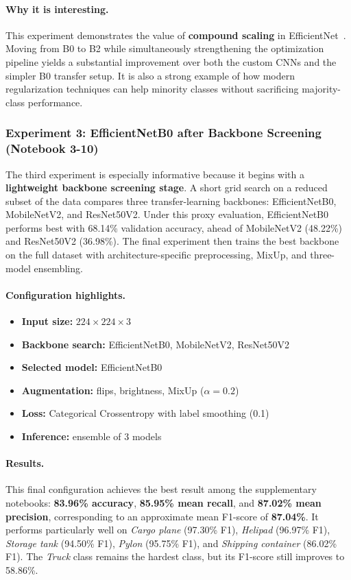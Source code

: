 \paragraph{Why it is interesting.} This experiment demonstrates the value of \textbf{compound scaling} in EfficientNet~\autocite{tan2019efficientnet}. Moving from B0 to B2 while simultaneously strengthening the optimization pipeline yields a substantial improvement over both the custom CNNs and the simpler B0 transfer setup. It is also a strong example of how modern regularization techniques can help minority classes without sacrificing majority-class performance.

\subsubsection{Experiment 3: EfficientNetB0 after Backbone Screening (Notebook 3-10)}

The third experiment is especially informative because it begins with a \textbf{lightweight backbone screening stage}. A short grid search on a reduced subset of the data compares three transfer-learning backbones: EfficientNetB0, MobileNetV2, and ResNet50V2. Under this proxy evaluation, EfficientNetB0 performs best with 68.14\% validation accuracy, ahead of MobileNetV2 (48.22\%) and ResNet50V2 (36.98\%). The final experiment then trains the best backbone on the full dataset with architecture-specific preprocessing, MixUp, and three-model ensembling.

\paragraph{Configuration highlights.}
\begin{itemize}
    \item \textbf{Input size:} $224 \times 224 \times 3$
    \item \textbf{Backbone search:} EfficientNetB0, MobileNetV2, ResNet50V2
    \item \textbf{Selected model:} EfficientNetB0
    \item \textbf{Augmentation:} flips, brightness, MixUp ($\alpha=0.2$)
    \item \textbf{Loss:} Categorical Crossentropy with label smoothing (0.1)
    \item \textbf{Inference:} ensemble of 3 models
\end{itemize}

\paragraph{Results.} This final configuration achieves the best result among the supplementary notebooks: \textbf{83.96\% accuracy}, \textbf{85.95\% mean recall}, and \textbf{87.02\% mean precision}, corresponding to an approximate mean F1-score of \textbf{87.04\%}. It performs particularly well on \textit{Cargo plane} (97.30\% F1), \textit{Helipad} (96.97\% F1), \textit{Storage tank} (94.50\% F1), \textit{Pylon} (95.75\% F1), and \textit{Shipping container} (86.02\% F1). The \textit{Truck} class remains the hardest class, but its F1-score still improves to 58.86\%.

